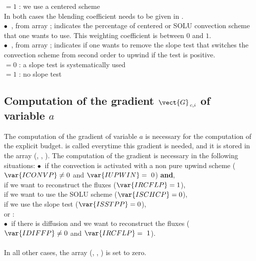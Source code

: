 \hspace*{1cm}$ = 1$ : we use a centered scheme\\
In both cases the blending coefficient  needs to be given in .\\
$\bullet \ $ , from array  ; indicates the percentage of centered or SOLU convection scheme that one wants to use. This weighting coefficient is between $0$ and $1$.\\
$\bullet \ $ , from array  ; indicates if one wants to remove the slope test that switches the convection scheme from second order to upwind if the test is positive.\\
\hspace*{1cm}$ = 0$ : a slope test is systematically used\\
\hspace*{1cm}$ = 1$ : no slope test
\subsection*{\bf Computation of the gradient $\vect{G}_{\,c,i}$ of variable $a$}
The computation of the gradient of variable $a$ is necessary for the computation of the explicit budget.    is called everytime this gradient is needed, and it is stored in the array (, , ). The computation of the gradient is necessary in the following situations: 
\hspace*{0.5cm}$\bullet \ $ if the convection is activated with a non pure upwind scheme 
 ($\var{ICONVP} \ne {0}$ and $\var{IUPWIN} =~0$) {\bf and},\\
\hspace*{1cm} if we want to reconstruct the fluxes  ($\var{IRCFLP} = {1}$),\\
\hspace*{1cm}{\bf or} if we want to use the SOLU scheme
($\var{ISCHCP} = {0}$),\\
\hspace*{1cm}{\bf or} if we use the slope test ($\var{ISSTPP} = {0}$),\\
or :\\
\hspace*{0.5cm}$\bullet \ $ if there is diffusion and we want to reconstruct the fluxes ($\var{IDIFFP} \ne {0}$ and $\var{IRCFLP} =~1$).\\\\
In all other cases, the array (, , ) is set to zero.

